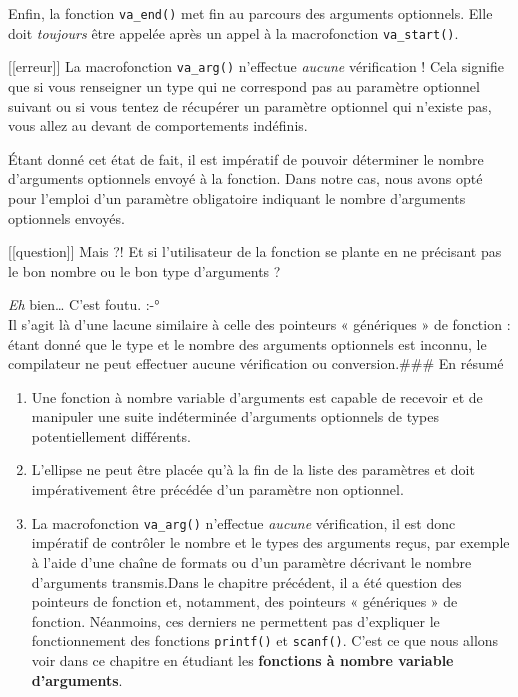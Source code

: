 \documentclass[]{article}
\providecommand{\tightlist}{%
  \setlength{\itemsep}{0pt}\setlength{\parskip}{0pt}}
\begin{document}
Enfin, la fonction \texttt{va\_end()} met fin au parcours des arguments
optionnels. Elle doit \emph{toujours} être appelée après un appel à la
macrofonction \texttt{va\_start()}.

{[}{[}erreur{]}{]} \textbar{} La macrofonction \texttt{va\_arg()}
n'effectue \emph{aucune} vérification ! Cela signifie que si vous
renseigner un type qui ne correspond pas au paramètre optionnel suivant
ou si vous tentez de récupérer un paramètre optionnel qui n'existe pas,
vous allez au devant de comportements indéfinis.

Étant donné cet état de fait, il est impératif de pouvoir déterminer le
nombre d'arguments optionnels envoyé à la fonction. Dans notre cas, nous
avons opté pour l'emploi d'un paramètre obligatoire indiquant le nombre
d'arguments optionnels envoyés.

{[}{[}question{]}{]} \textbar{} Mais ?! Et si l'utilisateur de la
fonction se plante en ne précisant pas le bon nombre ou le bon type
d'arguments ?

\emph{Eh} bien\ldots{} C'est foutu. :-°\\
Il s'agit là d'une lacune similaire à celle des pointeurs « génériques »
de fonction : étant donné que le type et le nombre des arguments
optionnels est inconnu, le compilateur ne peut effectuer aucune
vérification ou conversion.\#\#\# En résumé

\begin{enumerate}
\def\labelenumi{\arabic{enumi}.}
\tightlist
\item
  Une fonction à nombre variable d'arguments est capable de recevoir et
  de manipuler une suite indéterminée d'arguments optionnels de types
  potentiellement différents.
\item
  L'ellipse ne peut être placée qu'à la fin de la liste des paramètres
  et doit impérativement être précédée d'un paramètre non optionnel.
\item
  La macrofonction \texttt{va\_arg()} n'effectue \emph{aucune}
  vérification, il est donc impératif de contrôler le nombre et le types
  des arguments reçus, par exemple à l'aide d'une chaîne de formats ou
  d'un paramètre décrivant le nombre d'arguments transmis.Dans le
  chapitre précédent, il a été question des pointeurs de fonction et,
  notamment, des pointeurs « génériques » de fonction. Néanmoins, ces
  derniers ne permettent pas d'expliquer le fonctionnement des fonctions
  \texttt{printf()} et \texttt{scanf()}. C'est ce que nous allons voir
  dans ce chapitre en étudiant les \textbf{fonctions à nombre variable
  d'arguments}.
\end{enumerate}
\end{document}

